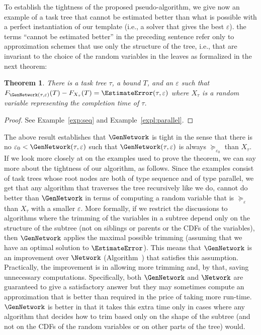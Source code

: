 \documentclass[review]{elsarticle}
\newtheorem{theorem}{Theorem}
\begin{document}
To establish the tightness of the proposed pseudo-algorithm, we give now an example of a task tree that cannot be estimated better than what is possible with a perfect instantiation of our template (i.e., a solver that gives the best $\varepsilon$). the terms ``cannot be estimated better'' in the preceding sentence refer only to approximation schemes that use only the structure of the tree, i.e., that are invariant to the choice of the random variables in the leaves as formalized in the next theorem:

\begin{theorem}\label{theorem:tight}
There is a task tree $\tau$, a bound $T$, and an $\varepsilon$ 
such that $F_{\GenNetwork(\tau, \varepsilon)}(T) - F_{X_\tau}(T) = \EstimateError(\tau, \varepsilon)$ where $X_\tau$ is a random variable representing the completion time of $\tau$. 
\end{theorem}
\begin{proof}
See Example~\ref{exp:seq} and Example~\ref{expl:parallel}.
\end{proof}



The above result establishes that $\GenNetwork$ is tight in the sense that there is no $\varepsilon_0 < \GenNetwork(\tau, \varepsilon)$ 
such that $\GenNetwork(\tau, \varepsilon)$ is always $\succeq_{\varepsilon_0}$ than $X_{\tau}$. 
If we look more closely at on the examples used
to prove the theorem, we can say more about the tightness of our algorithm, as follows.
Since the examples consist of task trees whose root nodes are both of
type sequence and of type parallel, we get that any algorithm that traverses the tree
recursively like we do, cannot do better than $\GenNetwork$ in terms of computing a
random variable that is $\succeq_{\varepsilon}$ than $X_{\tau}$ with a smaller $\varepsilon$. 
More formally, if we restrict the discussions to algorithms where the trimming of the variables in a subtree
depend only on the structure of the subtree (not on siblings or parents or the CDFs of the variables), then 
$\GenNetwork$ applies the maximal possible trimming (assuming that we have an optimal solution to $\EstimateError$). 
This means that $\GenNetwork$ is an improvement over 
$\Network$ (Algorithm~\label{alg:approx}) that satisfies this assumption. 
Practically, the improvement is in allowing more trimming and, by that, saving unnecessary computations. 
Specifically, both $\GenNetwork$ and $\Network$ are guaranteed to give a satisfactory answer but they may sometimes compute 
an approximation that is better than required in the price of taking more run-time. $\GenNetwork$ is better in that it
takes this extra time only in cases where any algorithm that decides how to trim based only on the shape of the subtree 
(and not on the CDFs of the random variables or on other parts of the tree) would.
\end{document}
